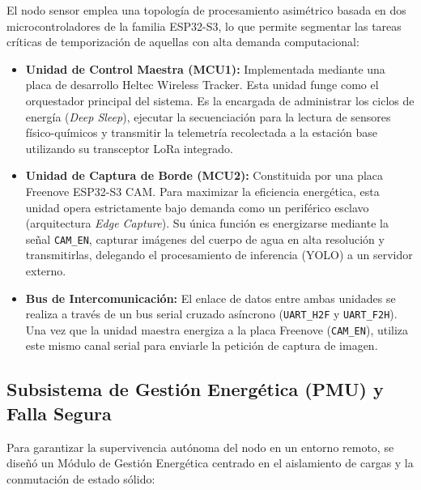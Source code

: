 El nodo sensor emplea una topología de procesamiento asimétrico basada en dos microcontroladores de la familia ESP32-S3, lo que permite segmentar las tareas críticas de temporización de aquellas con alta demanda computacional:

\begin{itemize}
  \item \textbf{Unidad de Control Maestra (MCU1):} Implementada mediante una placa de desarrollo Heltec Wireless Tracker. Esta unidad funge como el orquestador principal del sistema. Es la encargada de administrar los ciclos de energía (\textit{Deep Sleep}), ejecutar la secuenciación para la lectura de sensores físico-químicos y transmitir la telemetría recolectada a la estación base utilizando su transceptor LoRa integrado.
  \item \textbf{Unidad de Captura de Borde (MCU2):} Constituida por una placa Freenove ESP32-S3 CAM. Para maximizar la eficiencia energética, esta unidad opera estrictamente bajo demanda como un periférico esclavo (arquitectura \textit{Edge Capture}). Su única función es energizarse mediante la señal \texttt{CAM\_EN}, capturar imágenes del cuerpo de agua en alta resolución y transmitirlas, delegando el procesamiento de inferencia (YOLO) a un servidor externo.
  \item \textbf{Bus de Intercomunicación:} El enlace de datos entre ambas unidades se realiza a través de un bus serial cruzado asíncrono (\texttt{UART\_H2F} y \texttt{UART\_F2H}). Una vez que la unidad maestra energiza a la placa Freenove (\texttt{CAM\_EN}), utiliza este mismo canal serial para enviarle la petición de captura de imagen.
\end{itemize}

\subsection{Subsistema de Gestión Energética (PMU) y Falla Segura}
\label{subsec:subsistema_gestion_energetica}

Para garantizar la supervivencia autónoma del nodo en un entorno remoto, se diseñó un Módulo de Gestión Energética centrado en el aislamiento de cargas y la conmutación de estado sólido:

